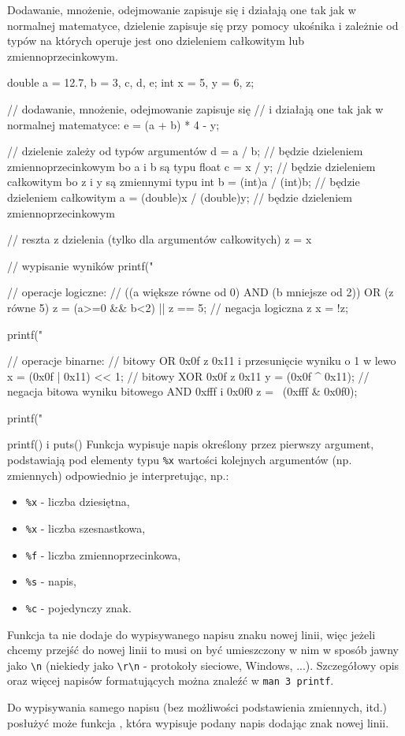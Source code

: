 \documentclass{pdfBooklets}
\begin{document}
Dodawanie, mnożenie, odejmowanie zapisuje się i działają one tak jak w normalnej matematyce, dzielenie zapisuje się przy pomocy ukośnika i zależnie od typów na których operuje jest ono dzieleniem całkowitym lub zmiennoprzecinkowym.

\begin{CodeFrame*}[c]{}
double a = 12.7, b = 3, c, d, e;
int x = 5, y = 6, z;

// dodawanie, mnożenie, odejmowanie zapisuje się
// i działają one tak jak w normalnej matematyce:
e = (a + b) * 4 - y;

// dzielenie zależy od typów argumentów
d = a / b; // będzie dzieleniem zmiennoprzecinkowym bo a i b są typu float
c = x / y; // będzie dzieleniem całkowitym bo z i y są zmiennymi typu int
b = (int)a / (int)b; // będzie dzieleniem całkowitym
a = (double)x / (double)y; // będzie dzieleniem zmiennoprzecinkowym

// reszta z dzielenia (tylko dla argumentów całkowitych)
z = x %

// wypisanie wyników
printf("%

// operacje logiczne:
// ((a większe równe od 0) AND (b mniejsze od 2)) OR (z równe 5)
z = (a>=0 && b<2) || z == 5;
// negacja logiczna z
x = !z;

printf("%

// operacje binarne:
// bitowy OR 0x0f z 0x11 i przesunięcie wyniku o 1 w lewo
x = (0x0f | 0x11) << 1;
// bitowy XOR 0x0f z 0x11
y = (0x0f ^ 0x11);
// negacja bitowa wyniku bitowego AND 0xfff i 0x0f0
z = ~(0xfff & 0x0f0);

printf("%
\end{CodeFrame*}

\begin{ProTip}{printf() i puts()}
Funkcja  wypisuje napis określony przez pierwszy argument, podstawiają pod elementy typu \Verb#%
\begin{itemize}
	\item \Verb#%
	\item \Verb#%
	\item \Verb#%
	\item \Verb#%
	\item \Verb#%
\end{itemize}
Funkcja ta nie dodaje do wypisywanego napisu znaku nowej linii, więc jeżeli chcemy przejść do nowej linii to musi on być umieszczony w nim w sposób jawny jako \Verb#\n# (niekiedy jako \Verb#\r\n# - protokoły sieciowe, Windows, ...).
Szczegółowy opis  oraz więcej napisów formatujących można znaleźć w \Verb#man 3 printf#.

\vspace{8pt}
Do wypisywania samego napisu (bez możliwości podstawienia zmiennych, itd.) posłużyć może funkcja , która wypisuje podany napis dodając znak nowej linii.
\end{ProTip}
\end{document}
